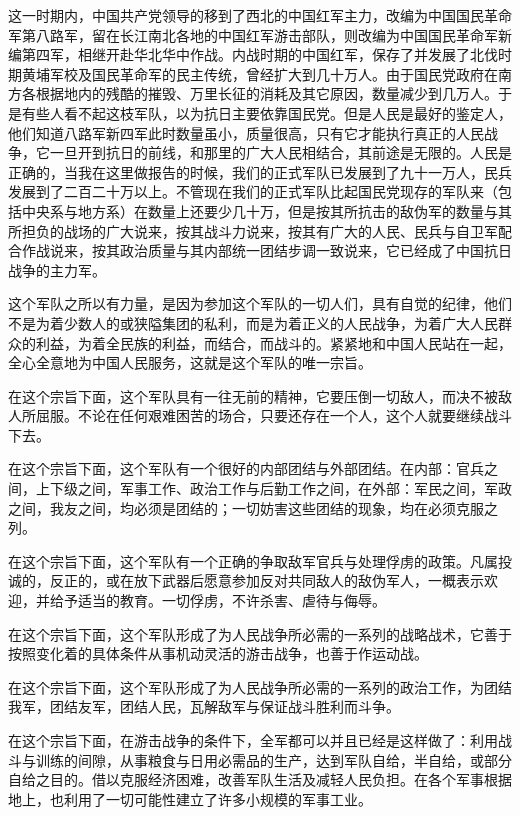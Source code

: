 这一时期内，中国共产党领导的移到了西北的中国红军主力，改编为中国国民革命军第八路军，留在长江南北各地的中国红军游击部队，则改编为中国国民革命军新编第四军，相继开赴华北华中作战。内战时期的中国红军，保存了并发展了北伐时期黄埔军校及国民革命军的民主传统，曾经扩大到几十万人。由于国民党政府在南方各根据地内的残酷的摧毁、万里长征的消耗及其它原因，数量减少到几万人。于是有些人看不起这枝军队，以为抗日主要依靠国民党。但是人民是最好的鉴定人，他们知道八路军新四军此时数量虽小，质量很高，只有它才能执行真正的人民战争，它一旦开到抗日的前线，和那里的广大人民相结合，其前途是无限的。人民是正确的，当我在这里做报告的时候，我们的正式军队已发展到了九十一万人，民兵发展到了二百二十万以上。不管现在我们的正式军队比起国民党现存的军队来（包括中央系与地方系）在数量上还要少几十万，但是按其所抗击的敌伪军的数量与其所担负的战场的广大说来，按其战斗力说来，按其有广大的人民、民兵与自卫军配合作战说来，按其政治质量与其内部统一团结步调一致说来，它已经成了中国抗日战争的主力军。

这个军队之所以有力量，是因为参加这个军队的一切人们，具有自觉的纪律，他们不是为着少数人的或狭隘集团的私利，而是为着正义的人民战争，为着广大人民群众的利益，为着全民族的利益，而结合，而战斗的。紧紧地和中国人民站在一起，全心全意地为中国人民服务，这就是这个军队的唯一宗旨。

在这个宗旨下面，这个军队具有一往无前的精神，它要压倒一切敌人，而决不被敌人所屈服。不论在任何艰难困苦的场合，只要还存在一个人，这个人就要继续战斗下去。

在这个宗旨下面，这个军队有一个很好的内部团结与外部团结。在内部：官兵之间，上下级之间，军事工作、政治工作与后勤工作之间，在外部：军民之间，军政之间，我友之间，均必须是团结的；一切妨害这些团结的现象，均在必须克服之列。

在这个宗旨下面，这个军队有一个正确的争取敌军官兵与处理俘虏的政策。凡属投诚的，反正的，或在放下武器后愿意参加反对共同敌人的敌伪军人，一概表示欢迎，并给予适当的教育。一切俘虏，不许杀害、虐待与侮辱。

在这个宗旨下面，这个军队形成了为人民战争所必需的一系列的战略战术，它善于按照变化着的具体条件从事机动灵活的游击战争，也善于作运动战。

在这个宗旨下面，这个军队形成了为人民战争所必需的一系列的政治工作，为团结我军，团结友军，团结人民，瓦解敌军与保证战斗胜利而斗争。

在这个宗旨下面，在游击战争的条件下，全军都可以并且已经是这样做了：利用战斗与训练的间隙，从事粮食与日用必需品的生产，达到军队自给，半自给，或部分自给之目的。借以克服经济困难，改善军队生活及减轻人民负担。在各个军事根据地上，也利用了一切可能性建立了许多小规模的军事工业。

